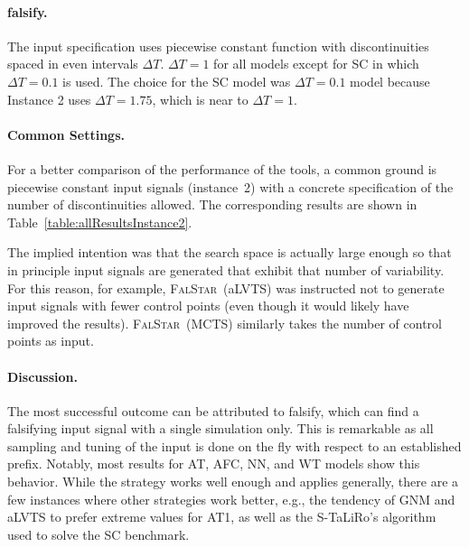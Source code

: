 \documentclass[a4paper]{easychair}
\newcommand{\STaLiRo}{S-TaLiRo\xspace}
\newcommand{\FalStar}{\textsc{FalStar}\xspace}
\newcommand{\falsify}{falsify\xspace}
\begin{document}
    \paragraph{\falsify.}
	The input specification uses piecewise constant function with discontinuities spaced in even intervals $\Delta T$.
	$\Delta T = 1$ for all models except for SC in which $\Delta T = 0.1$ is used.
	The choice for the SC model was $\Delta T = 0.1$ model because Instance 2 uses $\Delta T = 1.75$, which is near to $\Delta T = 1$.

    \paragraph{Common Settings.}

    For a better comparison of the performance of the tools, a common
    ground is piecewise constant input signals (instance~2) with a
    concrete specification of the number of discontinuities allowed.
    The corresponding results are shown in Table~\ref{table:allResultsInstance2}.

    The implied intention was that the search space is actually large
    enough so that in principle input signals are generated that
    exhibit that number of variability.  For this reason, for example,
    \FalStar~(aLVTS) was instructed not to generate input signals with
    fewer control points (even though it would likely have improved
    the results). \FalStar~(MCTS) similarly takes the number of
    control points as input. %

    

    \paragraph{Discussion.}

    The most successful outcome can be attributed to \falsify, which
    can find a falsifying input signal with a single simulation only.
    This is remarkable as all sampling and tuning of the input is done
    on the fly with respect to an established prefix.  Notably, most
    results for AT, AFC, NN, and WT models show this behavior.  While
    the strategy works well enough and applies generally, there are a
    few instances where other strategies work better, e.g., the
    tendency of GNM and aLVTS to prefer extreme values for AT1, as
    well as the \STaLiRo's algorithm used to solve the SC benchmark.
\end{document}
